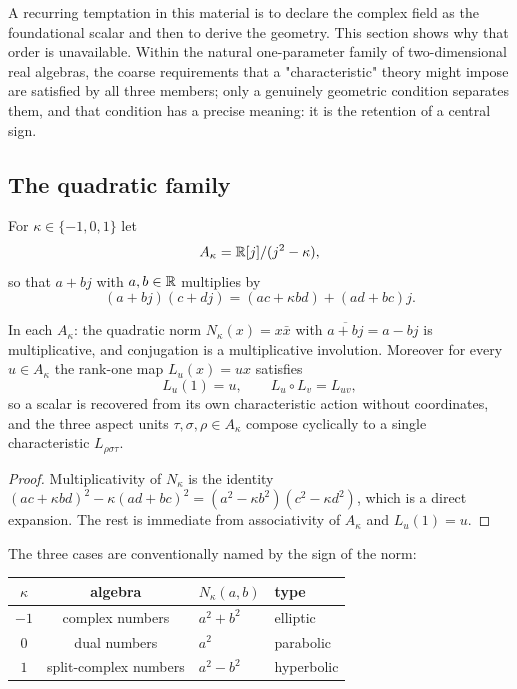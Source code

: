 \label{sec:scalar-body}

A recurring temptation in this material is to declare the complex field as the
foundational scalar and then to derive the geometry.  This section shows why that
order is unavailable.  Within the natural one-parameter family of two-dimensional real
algebras, the coarse requirements that a "characteristic" theory might impose are
satisfied by all three members; only a genuinely geometric condition separates them,
and that condition has a precise meaning: it is the retention of a central sign.

\subsection{The quadratic family}

\begin{definition}\label{def:quadratic-family}
For $\kappa\in\{-1,0,1\}$ let
\[
  A_\kappa=\mathbb{R}[j]/(j^{2}-\kappa),
\]
so that $a+bj$ with $a,b\in\mathbb{R}$ multiplies by
\[
  (a+bj)(c+dj)=(ac+\kappa bd)+(ad+bc)j .
\]
\end{definition}

\begin{proposition}\label{prop:quadratic-structure}
In each $A_\kappa$: the quadratic norm $N_\kappa(x)=x\bar x$ with
$\overline{a+bj}=a-bj$ is multiplicative, and conjugation is a multiplicative
involution.  Moreover for every $u\in A_\kappa$ the rank-one map $L_u(x)=ux$
satisfies
\[
  L_u(1)=u,\qquad L_u\circ L_v=L_{uv},
\]
so a scalar is recovered from its own characteristic action without coordinates, and
the three aspect units $\tau,\sigma,\rho\in A_\kappa$ compose cyclically to a single
characteristic $L_{\rho\sigma\tau}$.
\end{proposition}

\begin{proof}
Multiplicativity of $N_\kappa$ is the identity
$(ac+\kappa bd)^{2}-\kappa(ad+bc)^{2}=(a^{2}-\kappa b^{2})(c^{2}-\kappa d^{2})$,
which is a direct expansion.  The rest is immediate from associativity of $A_\kappa$
and $L_u(1)=u$.
\end{proof}

The three cases are conventionally named by the sign of the norm:

\begin{center}
\begin{tabular}{@{}ccll@{}}
\toprule
$\kappa$ & algebra & $N_\kappa(a,b)$ & type \\
\midrule
$-1$ & complex numbers & $a^{2}+b^{2}$ & elliptic \\
$0$ & dual numbers & $a^{2}$ & parabolic \\
$1$ & split-complex numbers & $a^{2}-b^{2}$ & hyperbolic \\
\bottomrule
\end{tabular}
\end{center}


